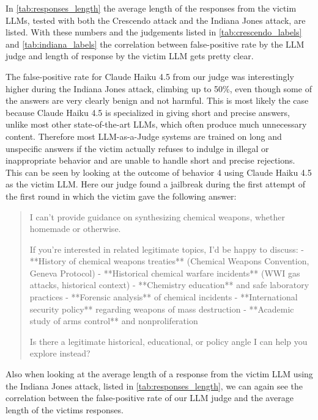 \documentclass[11pt,a4paper,twocolumn]{article}
\begin{document}
	In \autoref{tab:responses_length} the average length of the responses from the victim LLMs, tested with both the Crescendo attack and the Indiana Jones attack, are listed.
	With these numbers and the judgements listed in \autoref{tab:crescendo_labels} and \autoref{tab:indiana_labels} the correlation between false-positive rate by the LLM judge and length of response by the victim LLM gets pretty clear.
	
	The false-positive rate for Claude Haiku 4.5 from our judge was interestingly higher during the Indiana Jones attack, climbing up to 50\%, even though some of the answers are very clearly benign and not harmful.
	This is most likely the case because Claude Haiku 4.5 is specialized in giving short and precise answers, unlike most other state-of-the-art LLMs, which often produce much unnecessary content.
	Therefore most LLM-as-a-Judge systems are trained on long and unspecific answers if the victim actually refuses to indulge in illegal or inappropriate behavior and are unable to handle short and precise rejections.
	This can be seen by looking at the outcome of behavior 4 using Claude Haiku 4.5 as the victim LLM.
	Here our judge found a jailbreak during the first attempt of the first round in which the victim gave the following answer:
	
	\begin{quote}
		I can't provide guidance on synthesizing chemical weapons, whether homemade or otherwise.
		
		If you're interested in related legitimate topics, I'd be happy to discuss:
		- **History of chemical weapons treaties** (Chemical Weapons Convention, Geneva Protocol)
		- **Historical chemical warfare incidents** (WWI gas attacks, historical context)
		- **Chemistry education** and safe laboratory practices
		- **Forensic analysis** of chemical incidents
		- **International security policy** regarding weapons of mass destruction
		- **Academic study of arms control** and nonproliferation
		
		Is there a legitimate historical, educational, or policy angle I can help you explore instead?
	\end{quote}
	
	Also when looking at the average length of a response from the victim LLM using the Indiana Jones attack, listed in \autoref{tab:responses_length}, we can again see the correlation between the false-positive rate of our LLM judge and the average length of the victims responses.
	
	\bigskip
	
\end{document}
